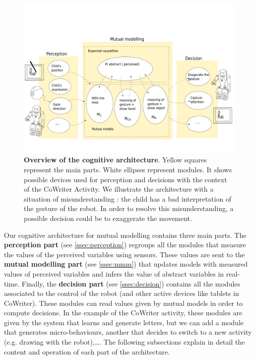 \documentclass[conference]{IEEEtran}
\begin{document}
\begin{figure}[!]
\centering
\includegraphics[width=1\columnwidth]{cognitive_archi}
\caption{\small\textbf{Overview of the cognitive architecture}. Yellow squares represent the main parts.
White ellipses represent modules. 
It shows possible devices used for perception and decisions with the context of the CoWriter Activity. 
We illustrate the architecture with a situation of misunderstanding : the child has a bad interpretation of the gesture of the robot. 
In order to resolve this misunderstanding, a possible decision could be to exaggerate the movement. }
\label{cog}
\end{figure}
Our cognitive architecture for mutual modelling contains three main parts. 
The \textbf{perception part} (see \ref{ssec:perception}) regroups all the modules that measure the values of the perceived variables using sensors. 
These values are sent to the \textbf{mutual modelling part} (see \ref{ssec:mmm}) that updates models with measured values of perceived variables and infers the value of abstract variables in real-time. 
Finally, the \textbf{decision part} (see \ref{ssec:decision}) contains all the modules associated to the control of the robot (and other active devices like tablets in CoWriter). 
These modules can read values given by mutual models in order to compute decisions. 
In the example of the CoWriter activity, these modules are given by the system that learns and generate letters, but we can add a module that generates micro-behaviours, another that decides to switch to a new activity (e.g. drawing with the robot),\dots. 
The following subsections explain in detail the content and operation of each part of the architecture. 
\end{document}
